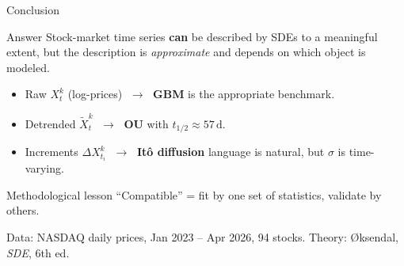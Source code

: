 \documentclass[aspectratio=169,10pt]{beamer}
\begin{document}
\begin{frame}{Conclusion}
\begin{block}{Answer}
Stock-market time series \textbf{can} be described by SDEs to a meaningful extent,
but the description is \emph{approximate} and depends on which object is modeled.
\end{block}

\smallskip
\begin{itemize}\setlength{\itemsep}{2pt}
  \item Raw $X_t^k$ (log-prices) $\;\to\;$ \textbf{GBM} is the appropriate benchmark.
  \item Detrended $\widetilde{X}_t^k$ $\;\to\;$ \textbf{OU} with $t_{1/2}\approx 57\,\text{d}$.
  \item Increments $\Delta X_{t_i}^k$ $\;\to\;$ \textbf{It\^{o} diffusion} language is natural,
        but $\sigma$ is time-varying.
\end{itemize}

\smallskip
\begin{alertblock}{Methodological lesson}
``Compatible'' = fit by one set of statistics, validate by others.
\end{alertblock}

\smallskip\centering\small
Data: NASDAQ daily prices, Jan 2023 -- Apr 2026, 94 stocks.
\quad Theory: {\O}ksendal, \textit{SDE}, 6th ed.

\end{frame}

\end{document}
